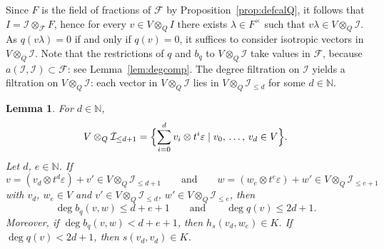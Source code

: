 \documentclass{amsart}
\newcommand{\calI}{\mathcal{I}}
\newcommand{\FQ}{F}
\newcommand{\fq}{\mathcal{F}}
\newtheorem{lemma}[prop]{Lemma}
\theoremstyle{remark}
\begin{document}
Since $\FQ$ is the field of fractions of $\fq$ by
Proposition~\ref{prop:defcalQ}, it follows that $I=\calI\otimes_\fq
\FQ$, hence for every $v\in V\otimes_QI$ there exists $\lambda\in
\FQ^\times$ such that $v\lambda\in V\otimes_Q\calI$. As
$q(v\lambda)=0$ if and only if $q(v)=0$, it suffices to consider
isotropic vectors in $V\otimes_Q\calI$. Note that the restrictions of
$q$ and $b_q$ to $V\otimes_Q\calI$ take values in $\fq$, because
$a(\calI,\calI)\subset\fq$: see Lemma~\ref{lem:degcomp}. The degree
filtration on $\calI$ yields a filtration on $V\otimes_Q\calI$: each
vector in $V\otimes_Q\calI$ lies in $V\otimes_Q\calI_{\leq d}$ for
some $d\in\mathbb{N}$.

\begin{lemma}
  \label{lem:deg}
  For $d\in\mathbb{N}$,
  \[
    V\otimes_Q\calI_{\leq d+1} = \Bigl\{
    \sum_{i=0}^d v_i\otimes t^i\varepsilon\mid v_0,\,\ldots,\,v_d\in
    V\Bigr\}.
  \]
  Let $d$, $e\in\mathbb{N}$. If
  \[
    v=(v_{d}\otimes t^{d}\varepsilon) + v'\in V\otimes_Q\calI_{\leq d+1}
    \qquad\text{and}\qquad
    w = (w_{e}\otimes t^{e}\varepsilon) + w'\in V\otimes_Q\calI_{\leq e+1}
  \]
  with $v_{d}$, $w_{e}\in V$ and $v'\in V\otimes_Q\calI_{\leq
    d}$, $w'\in V\otimes_Q\calI_{\leq e}$, then
  \[
    \deg b_q(v,w) \leq d+e+1 \qquad\text{and}\qquad
    \deg q(v) \leq 2d+1.
  \]
  Moreover, if $\deg b_q(v,w)< d+e+1$, then $h_s(v_{d},
  w_{e})\in K$. If $\deg q(v) <2d+1$, then
  $s(v_{d},v_{d})\in K$.
\end{lemma}
\end{document}
